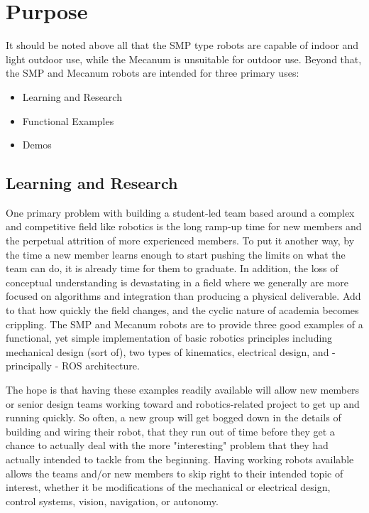
\chapter{Purpose}
\label{chap:purpose}

It should be noted above all that the SMP type robots are capable of indoor and light outdoor use, while the Mecanum is unsuitable for outdoor use. Beyond that, the SMP and Mecanum robots are intended for three primary uses:

\begin{itemize}
\item{Learning and Research}
\item{Functional Examples}
\item{Demos}
\end{itemize}

\section{Learning and Research}

One primary problem with building a student-led team based around a complex and competitive field like robotics is the long ramp-up time for new members and the perpetual attrition of more experienced members. To put it another way, by the time a new member learns enough to start pushing the limits on what the team can do, it is already time for them to graduate. In addition, the loss of conceptual understanding is devastating in a field where we generally are more focused on algorithms and integration than producing a physical deliverable. Add to that how quickly the field changes, and the cyclic nature of academia becomes crippling. The SMP and Mecanum robots are to provide three good examples of a functional, yet simple implementation of basic robotics principles including mechanical design (sort of), two types of kinematics, electrical design, and - principally - ROS architecture.

The hope is that having these examples readily available will allow new members or senior design teams working toward and robotics-related project to get up and running quickly. So often, a new group will get bogged down in the details of building and wiring their robot, that they run out of time before they get a chance to actually deal with the more "interesting" problem that they had actually intended to tackle from the beginning. Having working robots available allows the teams and/or new members to skip right to their intended topic of interest, whether it be modifications of the mechanical or electrical design, control systems, vision, navigation, or autonomy.

